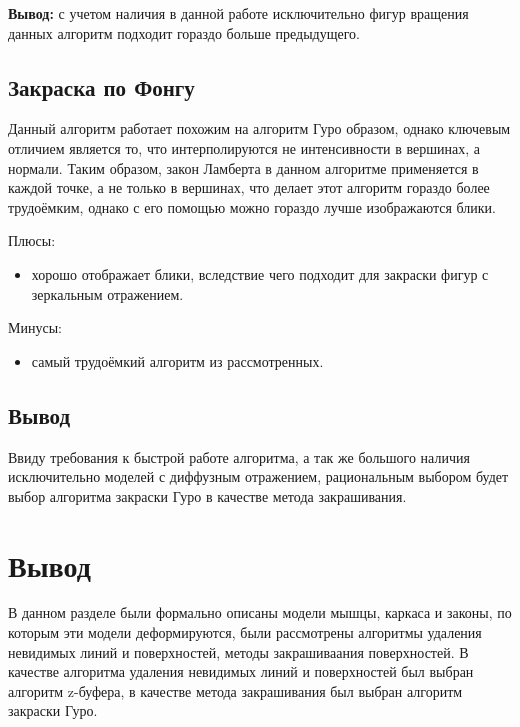 \textbf{Вывод:} с учетом наличия в данной работе исключительно фигур вращения данных алгоритм подходит гораздо больше предыдущего.


\subsection{Закраска по Фонгу}
Данный алгоритм работает похожим на алгоритм Гуро образом, однако ключевым отличием является то, что интерполируются не интенсивности в вершинах, а нормали. Таким образом, закон Ламберта в данном алгоритме применяется в каждой точке, а не только в вершинах, что делает этот алгоритм гораздо более трудоёмким, однако с его помощью можно гораздо лучше изображаются блики.

Плюсы:
\begin{itemize}
    \item хорошо отображает блики, вследствие чего подходит для закраски фигур с зеркальным отражением.
\end{itemize}

Минусы:
\begin{itemize}
    \item самый трудоёмкий алгоритм из рассмотренных.
\end{itemize}

\subsection*{Вывод}

Ввиду требования к быстрой работе алгоритма, а так же большого наличия исключительно моделей с диффузным отражением, рациональным выбором будет выбор алгоритма закраски Гуро в качестве метода закрашивания.


\section*{Вывод}

В данном разделе были формально описаны модели мышцы, каркаса и законы, по которым эти модели деформируются, были рассмотрены алгоритмы удаления невидимых линий и поверхностей, методы закрашиваания поверхностей. В качестве алгоритма удаления невидимых линий и поверхностей был выбран алгоритм z-буфера, в качестве метода закрашивания был выбран алгоритм закраски Гуро.
